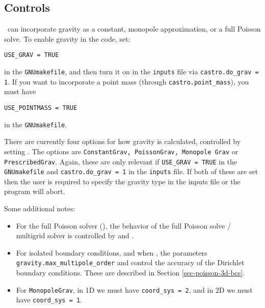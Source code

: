 \subsection{Controls}
\castro\ can incorporate gravity as a constant, monopole approximation,
or a full Poisson solve.  To enable gravity in the code, set:
\begin{verbatim}
USE_GRAV = TRUE
\end{verbatim}
in the {\tt GNUmakefile}, and then turn it on in the {\tt inputs} file
via {\tt castro.do\_grav = 1}.  If you want to incorporate a point mass
(through {\tt castro.point\_mass}), you must have
\begin{verbatim}
USE_POINTMASS = TRUE
\end{verbatim}
in the {\tt GNUmakefile}.

There are currently four options for how gravity is calculated,
controlled by setting .  The options are
{\tt ConstantGrav, PoissonGrav, Monopole Grav} or {\tt
  PrescribedGrav}.  Again, these are only relevant if {\tt USE\_GRAV =
  TRUE} in the {\tt GNUmakefile} and {\tt castro.do\_grav = 1} in the
{\tt inputs} file.  If both of these are set then the user is required
to specify the gravity type in the inputs file or the program will
abort.

Some additional notes:
\begin{itemize}

\item For the full Poisson solver
  (), the behavior
  of the full Poisson solve / multigrid solver is controlled by
   and .

\item For isolated boundary conditions, and when
  , the parameters
           {\tt gravity.max\_multipole\_order} and
            control the accuracy of
           the Dirichlet boundary conditions.  These are described in
           Section \ref{sec-poisson-3d-bcs}.

\item For {\tt MonopoleGrav}, in 1D we must have {\tt coord\_sys = 2}, and in
  2D we must have {\tt coord\_sys = 1}.
\end{itemize}

